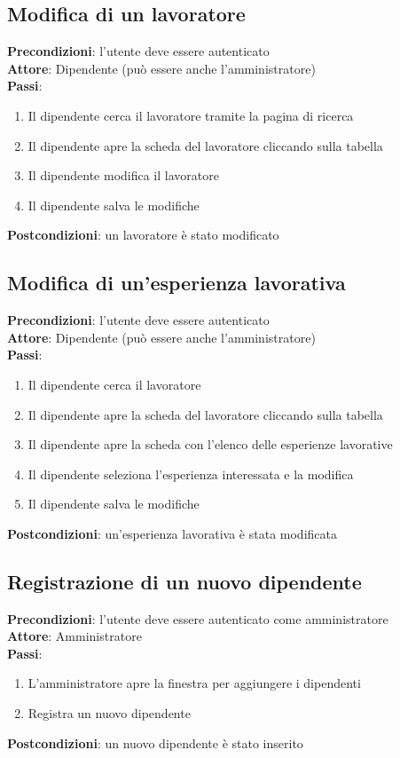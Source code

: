 \documentclass[ 4paper,11pt,openany]{book}
\begin{document}
\subsection{Modifica di un lavoratore}
\textbf{Precondizioni}: l'utente deve essere autenticato\\
\textbf{Attore}: Dipendente (può essere anche l'amministratore)\\
\textbf{Passi}:
\begin{enumerate}
\item Il dipendente cerca il lavoratore tramite la pagina di ricerca
\item Il dipendente apre la scheda del lavoratore cliccando sulla tabella 
\item Il dipendente modifica il lavoratore
\item Il dipendente salva le modifiche
\end{enumerate}
\textbf{Postcondizioni}: un lavoratore è stato modificato\\

\subsection{Modifica di un'esperienza lavorativa}
\textbf{Precondizioni}: l'utente deve essere autenticato\\
\textbf{Attore}: Dipendente (può essere anche l'amministratore)\\
\textbf{Passi}:
\begin{enumerate}
\item Il dipendente cerca il lavoratore
\item Il dipendente apre la scheda del lavoratore cliccando sulla tabella
\item Il dipendente apre la scheda con l'elenco delle esperienze lavorative
\item Il dipendente seleziona l'esperienza interessata e la modifica
\item Il dipendente salva le modifiche
\end{enumerate}
\textbf{Postcondizioni}: un'esperienza lavorativa è stata modificata\\

\subsection{Registrazione di un nuovo dipendente}
\textbf{Precondizioni}: l'utente deve essere autenticato come amministratore\\
\textbf{Attore}: Amministratore\\
\textbf{Passi}:
\begin{enumerate}
\item L'amministratore apre la finestra per aggiungere i dipendenti 
\item Registra un nuovo dipendente
\end{enumerate}
\textbf{Postcondizioni}: un nuovo dipendente è stato inserito\\
\end{document}

